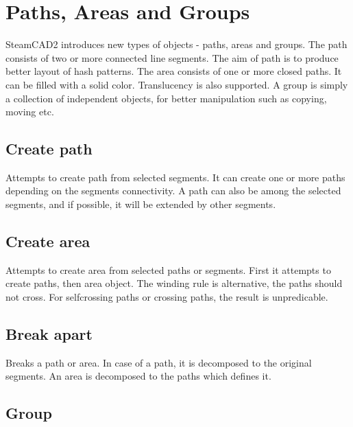 \chapter{Paths, Areas and Groups}\label{chap:chap4}

SteamCAD2 introduces new types of objects - paths, areas and groups. The path consists of
two or more connected line segments. The aim of path is to produce better layout of hash patterns.
The area consists of one or more closed paths. It can be filled with a solid color. Translucency
is also supported. A group is simply a collection of independent objects, for better manipulation
such as copying, moving etc.

\section{Create path}\label{sec:createpath}

Attempts to create path from selected segments. It can create one or more paths depending on
the segments connectivity. A path can also be among the selected segments, and if possible,
it will be extended by other segments.

\section{Create area}\label{sec:createarea}

Attempts to create area from selected paths or segments. First it attempts to create paths,
then area object. The winding rule is alternative, the paths should not cross. For selfcrossing
paths or crossing paths, the result is unpredicable.

\section{Break apart}\label{sec:breakapart}

Breaks a path or area. In case of a path, it is decomposed to the original segments. An area
is decomposed to the paths which defines it.

\section{Group}\label{sec:group}

